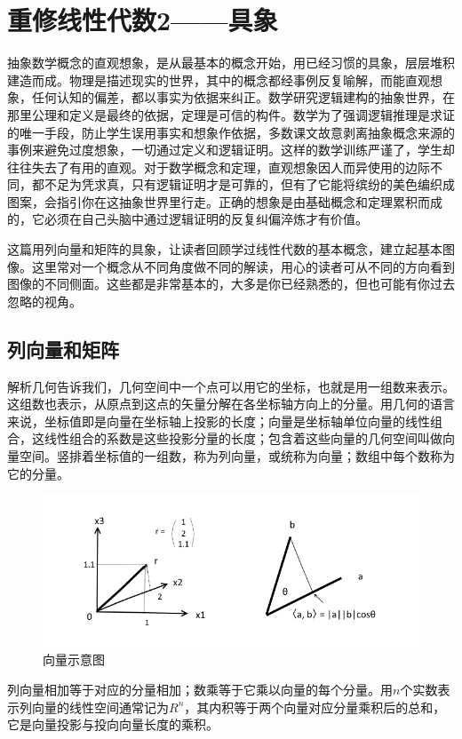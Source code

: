 
\section{重修线性代数2——具象}
抽象数学概念的直观想象，是从最基本的概念开始，用已经习惯的具象，层层堆积建造而成。物理是描述现实的世界，其中的概念都经事例反复喻解，而能直观想象，任何认知的偏差，都以事实为依据来纠正。数学研究逻辑建构的抽象世界，在那里公理和定义是最终的依据，定理是可信的构件。数学为了强调逻辑推理是求证的唯一手段，防止学生误用事实和想象作依据，多数课文故意剥离抽象概念来源的事例来避免过度想象，一切通过定义和逻辑证明。这样的数学训练严谨了，学生却往往失去了有用的直观。对于数学概念和定理，直观想象因人而异使用的边际不同，都不足为凭求真，只有逻辑证明才是可靠的，但有了它能将缤纷的美色编织成图案，会指引你在这抽象世界里行走。正确的想象是由基础概念和定理累积而成的，它必须在自己头脑中通过逻辑证明的反复纠偏淬炼才有价值。

这篇用列向量和矩阵的具象，让读者回顾学过线性代数的基本概念，建立起基本图像。这里常对一个概念从不同角度做不同的解读，用心的读者可从不同的方向看到图像的不同侧面。这些都是非常基本的，大多是你已经熟悉的，但也可能有你过去忽略的视角。
\subsection{列向量和矩阵}
解析几何告诉我们，几何空间中一个点可以用它的坐标，也就是用一组数来表示。这组数也表示，从原点到这点的矢量分解在各坐标轴方向上的分量。用几何的语言来说，坐标值即是向量在坐标轴上投影的长度；向量是坐标轴单位向量的线性组合，这线性组合的系数是这些投影分量的长度；包含着这些向量的几何空间叫做向量空间。竖排着坐标值的一组数，称为列向量，或统称为向量；数组中每个数称为它的分量。

\begin{figure}[h]
	\centering
	\includegraphics[width=0.7\linewidth]{pic/153404gr2s818g3sg3g1h9.png}
	\caption{向量示意图}
	\label{fig:153404gr2s818g3sg3g1h9}
\end{figure}


列向量相加等于对应的分量相加；数乘等于它乘以向量的每个分量。用$ n $个实数表示列向量的线性空间通常记为$ R^n $，其内积等于两个向量对应分量乘积后的总和，它是向量投影与投向向量长度的乘积。

